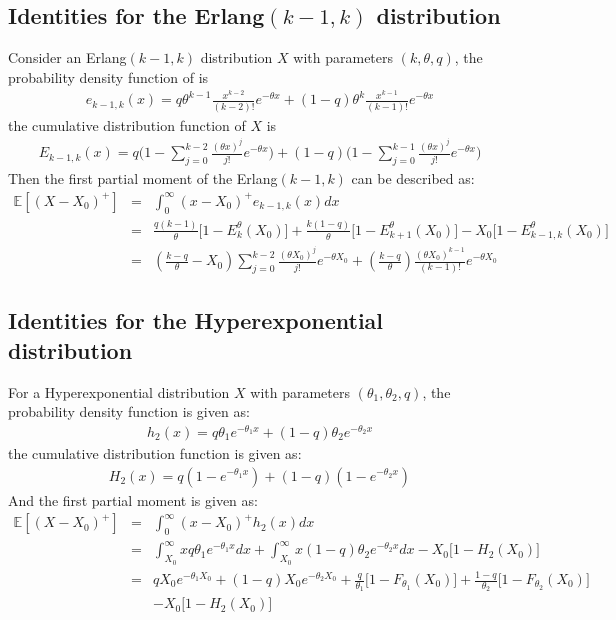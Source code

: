 \documentclass[preprint,12pt]{elsarticle}
\begin{document}
\subsection{Identities for the Erlang$(k-1,k)$ distribution}
Consider an Erlang$(k-1,k)$ distribution $X$ with parameters $(k,\theta,q)$, the probability density function of is
\begin{eqnarray}
e_{k-1,k}(x)=q\theta^{k-1}\frac{x^{k-2}}{(k-2)!}e^{-\theta x} + (1-q)\theta^{k}\frac{x^{k-1}}{(k-1)!}e^{-\theta x} \nonumber
\end{eqnarray}
the cumulative distribution function of $X$ is
\begin{eqnarray}
E_{k-1,k}(x)=q\bigg(1-\sum_{j=0}^{k-2}\frac{(\theta x)^{j}}{j!}e^{-\theta x} \bigg)+(1-q)\bigg(1-\sum_{j=0}^{k-1}\frac{(\theta x)^{j}}{j!}e^{-\theta x} \bigg) \nonumber
\end{eqnarray}
Then the first partial moment of the Erlang$(k-1,k)$ can be described as:
\begin{eqnarray}
\mathbb{E}{[(X-X_{0})^{+}]} &=& \int_{0}^{\infty}{(x-X_{0})^{+}e_{k-1,k}(x)d x} \nonumber\\
&=& \frac{q(k-1)}{\theta}\bigg[1-E_{k}^{\theta}(X_{0})\bigg]+\frac{k(1-q)}{\theta}\bigg[1-E_{k+1}^{\theta}(X_{0})\bigg]-X_{0}\bigg[1-E_{k-1,k}^{\theta}(X_{0})\bigg] \nonumber\\
&=&(\frac{k-q}{\theta}-X_{0})\sum_{j=0}^{k-2}{\frac{(\theta X_{0})^j}{j!}e^{-\theta X_{0}}}+(\frac{k-q}{\theta})\frac{(\theta X_{0})^{k-1}}{(k-1)!}e^{-\theta X_{0}}\nonumber
\end{eqnarray}

\subsection{Identities for the Hyperexponential distribution}
For a Hyperexponential distribution $X$ with parameters $(\theta_1,\theta_2,q)$, the probability density function is given as:
\begin{eqnarray}
h_{2}(x) = q\theta_{1}e^{-\theta_{1}x} + (1-q)\theta_{2}e^{-\theta_{2}x} \nonumber
\end{eqnarray}
the cumulative distribution function is given as:
\begin{eqnarray}
H_{2}(x) = q(1-e^{-\theta_{1}x})+(1-q)(1-e^{-\theta_{2}x}) \nonumber
\end{eqnarray}
And the first partial moment is given as:
\begin{eqnarray}
\mathbb{E}{[(X-X_{0})^{+}]} &=& \int^{\infty}_{0}(x-X_{0})^{+}h_{2}(x)dx \nonumber\\
&=& \int^{\infty}_{X_{0}}{xq\theta_{1}e^{-\theta_{1}x}dx} + \int^{\infty}_{X_{0}}{x(1-q)\theta_{2}e^{-\theta_{2}x}dx}-X_{0}\bigg[1-H_{2}(X_{0}) \bigg] \nonumber\\
&=& qX_{0}e^{-\theta_{1}X_{0}} + (1-q)X_{0}e^{-\theta_{2}X_{0}} + \frac{q}{\theta_{1}}\bigg[1-F_{\theta_{1}}(X_{0})\bigg]+\frac{1-q}{\theta_{2}}\bigg[1-F_{\theta_{2}}(X_{0}) \bigg] \nonumber\\
&&-X_{0}\bigg[ 1- H_{2}(X_{0})\bigg] \nonumber
\end{eqnarray}
\end{document}
